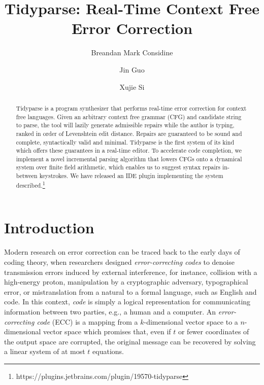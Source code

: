 \documentclass[sigplan,nonacm]{acmart}\settopmatter{printfolios=false,printccs=false,printacmref=false}
\begin{document}
\title{Tidyparse: Real-Time Context Free Error Correction}
\begin{abstract}
Tidyparse is a program synthesizer that performs real-time error correction for context free languages.
Given an arbitrary context free grammar (CFG) and candidate string to parse, the tool will lazily generate admissible repairs while the author is typing, ranked in order of Levenshtein edit distance.
 Repairs are guaranteed to be sound and complete, syntactically valid and minimal.
 Tidyparse is the first system of its kind which offers these guarantees in a real-time editor. To accelerate code completion, we implement a novel incremental parsing algorithm that lowers CFGs onto a dynamical system over finite field arithmetic, which enables us to suggest syntax repairs in-between keystrokes. We have released an IDE plugin implementing the system described.\footnote{https://plugins.jetbrains.com/plugin/19570-tidyparse}
\end{abstract}

\author{Breandan Mark Considine}

\author{Jin Guo}

\author{Xujie Si}

\maketitle

\section{Introduction}

Modern research on error correction can be traced back to the early days of coding theory, when researchers designed \textit{error-correcting codes} to denoise transmission errors induced by external interference, for instance, collision with a high-energy proton, manipulation by a cryptographic adversary, typographical error, or mistranslation from a natural to a formal language, such as English and code. In this context, \textit{code} is simply a logical representation for communicating information between two parties, e.g., a human and a computer. An \textit{error-correcting code} (ECC) is a mapping from a $k$-dimensional vector space to a $n$-dimensional vector space which promises that, even if $t$ or fewer coordinates of the output space are corrupted, the original message can be recovered by solving a linear system of at most $t$ equations. %
\end{document}
